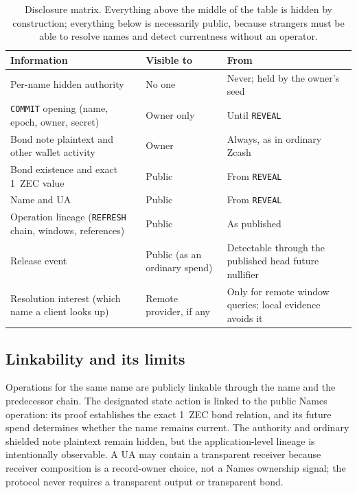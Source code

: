 \documentclass[11pt]{article}
\newcommand{\operation}[1]{\texttt{#1}}
\begin{document}
\begin{table}[ht]
\centering
\small
\begin{tabular}{>{\raggedright\arraybackslash}p{}>{\raggedright\arraybackslash}p{}>{\raggedright\arraybackslash}p{}}
\toprule
Information & Visible to & From \\
\midrule
Per-name hidden authority & No one & Never; held by the owner's seed \\
\operation{COMMIT} opening (name, epoch, owner, secret) & Owner only & Until \operation{REVEAL} \\
Bond note plaintext and other wallet activity & Owner & Always, as in ordinary Zcash \\
Bond existence and exact 1~ZEC value & Public & From \operation{REVEAL} \\
Name and UA & Public & From \operation{REVEAL} \\
Operation lineage (\operation{REFRESH} chain, windows, references) & Public & As published \\
Release event & Public (as an ordinary spend) & Detectable through the published head future nullifier \\
Resolution interest (which name a client looks up) & Remote provider, if any & Only for remote window queries; local evidence avoids it \\
\bottomrule
\end{tabular}
\caption{Disclosure matrix. Everything above the middle of the table is
hidden by construction; everything below is necessarily public, because
strangers must be able to resolve names and detect currentness without an
operator.}
\label{tab:disclosure}
\end{table}

\subsection{Linkability and its limits}

Operations for the same name are publicly linkable through the name and the
predecessor chain. The designated state action is linked to the public Names
operation: its proof establishes the exact 1~ZEC bond relation, and its
future spend determines whether the name remains current. The authority and
ordinary shielded note plaintext remain hidden, but the application-level
lineage is intentionally observable. A UA may contain a transparent receiver
because receiver composition is a record-owner choice, not a Names ownership
signal; the protocol never requires a transparent output or transparent bond.
\end{document}
